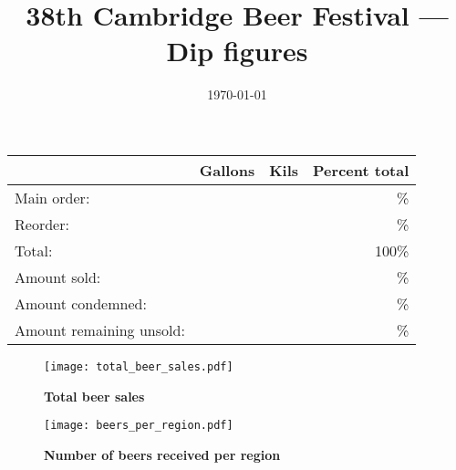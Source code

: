 \documentclass{article}
\begin{document}
\normalem
\title{38th Cambridge Beer Festival --- Dip figures}
\date{\today}
\maketitle

\begin{center}
\begin{tabular}{ | l | r | r | r | }
  \hline \hline
   & Gallons & Kils & Percent total \\ \hline
  Main order: &  &  & \% \\ \hline
  Reorder: &  &  & \% \\ \hline
  Total: &  &  & 100\% \\ \hline \hline
  Amount sold: &  &  & \% \\ \hline
  Amount condemned: &  &  & \% \\ \hline
  Amount remaining unsold: &  &  & \% \\ \hline \hline
\end{tabular}
\end{center}

\begin{figure}[htp]
  \begin{center}
    \texttt{[image: total\_beer\_sales.pdf]}
  \end{center}
  \caption{\textbf{Total beer sales}}
  \label{total_beer_sales}
\end{figure}


\begin{figure}[htp]
  \begin{center}
    \texttt{[image: beers\_per\_region.pdf]}
  \end{center}
  \caption{\textbf{Number of beers received per region}}
  \label{beers_per_region}
\end{figure}

\end{document}
